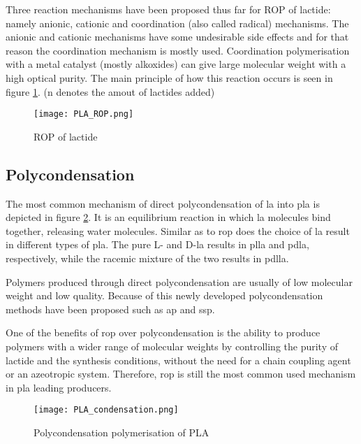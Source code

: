 Three reaction mechanisms have been proposed thus far for ROP of lactide: namely anionic, cationic and coordination (also called radical) mechanisms. The anionic and cationic mechanisms have some undesirable side effects and for that reason the coordination mechanism is mostly used. 
Coordination polymerisation with a metal catalyst (mostly alkoxides) can give large molecular weight with a high optical purity. The main principle of how this reaction occurs is seen in figure \ref{fig:PLA_ROP}. (n denotes the amout of lactides added)

\begin{figure}[ht]
    \centering
    \texttt{[image: PLA\_ROP.png]}
    \caption{ROP of lactide}
    \label{fig:PLA_ROP}
\end{figure}

\subsection{Polycondensation}

The most common mechanism of direct polycondensation of \gls{la} into \gls{pla} is depicted in figure \ref{fig:PLA_condensation}. It is an equilibrium reaction in which \gls{la} molecules bind together, releasing water molecules. Similar as to \gls{rop} does the choice of \gls{la} result in different types of \gls{pla}. 
The pure L- and D-\gls{la} results in \gls{plla} and \gls{pdla}, respectively, while the racemic mixture of the two results in \gls{pdlla}. 

Polymers produced through direct polycondensation are usually of low molecular weight and low quality. Because of this newly developed polycondensation methods have been proposed such as \gls{ap} and \gls{ssp}. 

One of the benefits of \gls{rop} over polycondensation is the ability to produce polymers with a wider range of molecular weights by controlling the purity of lactide and the synthesis conditions, without the need for a chain coupling agent or an azeotropic system. 
Therefore, \gls{rop} is still the most common used mechanism in \gls{pla} leading producers.

\begin{figure}[ht]
    \centering
    \texttt{[image: PLA\_condensation.png]}
    \caption{Polycondensation polymerisation of PLA}
    \label{fig:PLA_condensation}
\end{figure}
